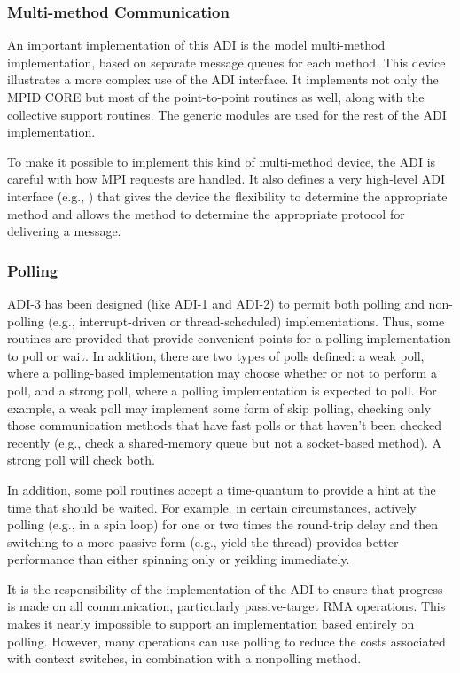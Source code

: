 \documentclass{article}
\begin{document}
\subsubsection{Multi-method Communication}
An important implementation of this ADI is the model multi-method
implementation, based on separate message queues for each method.
This device illustrates a more complex use of the ADI interface.  It
implements not only the MPID CORE but most of the point-to-point
routines as well, along with the collective support routines.  The
generic modules are used for the rest of the ADI implementation.

To make it possible to implement this kind of multi-method device, the
ADI is careful with how MPI requests are handled.  It also defines a
very high-level ADI interface (e.g., ) that gives the
device the flexibility to determine the appropriate method and allows
the method to determine the appropriate protocol for delivering a message.

\subsubsection{Polling}
ADI-3 has been designed (like ADI-1 and ADI-2) to permit both polling and
non-polling (e.g., interrupt-driven or thread-scheduled) implementations.
Thus, some routines are provided that provide convenient points for a polling
implementation to poll or wait.  In addition, there are two types of
polls defined: a weak poll, where a polling-based implementation may
choose whether or not to perform a poll, and a strong poll, where a
polling implementation is expected to poll.  For example, a weak poll
may implement some form of skip polling, checking only those
communication methods that have fast polls or that haven't been
checked recently (e.g., check a shared-memory queue but not a
socket-based method).  A strong poll will check both.

In addition, some poll routines accept a time-quantum to provide a
hint at the time that should be waited.  For example, in certain
circumstances, actively polling (e.g., in a spin loop) for one or two
times the round-trip delay and then switching to a more passive form
(e.g., yield the thread) provides better performance than either
spinning only or yeilding immediately.


It is the responsibility of the implementation of the ADI to ensure that
progress is made on all communication, particularly passive-target RMA
operations.  This makes it nearly impossible to support an implementation
based entirely on polling.  However, many operations can use polling to reduce
the costs associated with context switches, in combination with a nonpolling
method.
\end{document}
